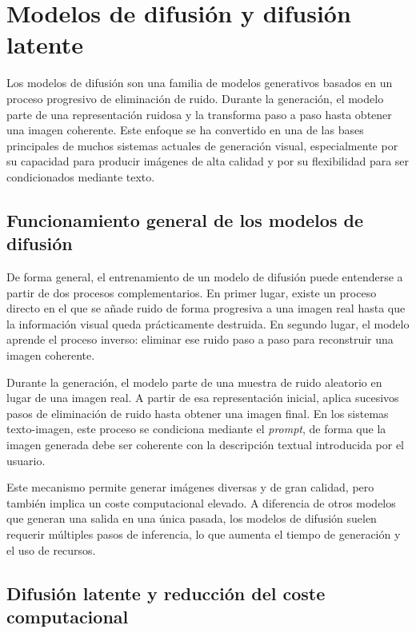 \documentclass[a4paper,11pt,titlepage]{scrbook}
\begin{document}
\section{Modelos de difusión y difusión latente}

Los modelos de difusión son una familia de modelos generativos basados en un proceso progresivo de eliminación de ruido. Durante la generación, el modelo parte de una representación ruidosa y la transforma paso a paso hasta obtener una imagen coherente. Este enfoque se ha convertido en una de las bases principales de muchos sistemas actuales de generación visual, especialmente por su capacidad para producir imágenes de alta calidad y por su flexibilidad para ser condicionados mediante texto.

\subsection{Funcionamiento general de los modelos de difusión}

De forma general, el entrenamiento de un modelo de difusión puede entenderse a partir de dos procesos complementarios. En primer lugar, existe un proceso directo en el que se añade ruido de forma progresiva a una imagen real hasta que la información visual queda prácticamente destruida. En segundo lugar, el modelo aprende el proceso inverso: eliminar ese ruido paso a paso para reconstruir una imagen coherente.

\medskip

Durante la generación, el modelo parte de una muestra de ruido aleatorio en lugar de una imagen real. A partir de esa representación inicial, aplica sucesivos pasos de eliminación de ruido hasta obtener una imagen final. En los sistemas texto-imagen, este proceso se condiciona mediante el \textit{prompt}, de forma que la imagen generada debe ser coherente con la descripción textual introducida por el usuario.

\medskip

Este mecanismo permite generar imágenes diversas y de gran calidad, pero también implica un coste computacional elevado. A diferencia de otros modelos que generan una salida en una única pasada, los modelos de difusión suelen requerir múltiples pasos de inferencia, lo que aumenta el tiempo de generación y el uso de recursos.

\subsection{Difusión latente y reducción del coste computacional}
\end{document}
